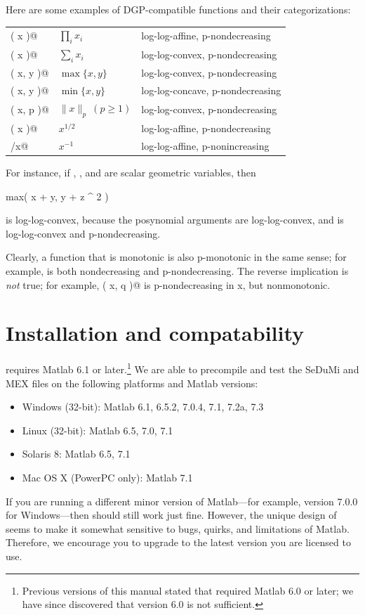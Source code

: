 \documentclass[12pt]{article}
\begin{document}
Here are some examples of DGP-compatible functions and their categorizations:
\begin{center}
\begin{tabular}{lll}
	\verb@prod( x )@    & $\prod_i x_i$& log-log-affine,  p-nondecreasing \\
	\verb@sum( x )@     & $\sum_i x_i$ & log-log-convex,  p-nondecreasing \\
	\verb@max( x, y )@  & $\max\{x,y\}$ & log-log-convex, p-nondecreasing \\
	\verb@min( x, y )@  & $\min\{x,y\}$ & log-log-concave, p-nondecreasing \\
	\verb@norm( x, p )@ & $\|x\|_p~(p\geq 1)$ & log-log-convex,  p-nondecreasing \\ 
	\verb@sqrt( x )@    & $x^{1/2}$    & log-log-affine, p-nondecreasing \\
	\verb@1/x@          & $x^{-1}$     & log-log-affine, p-nonincreasing
\end{tabular}
\end{center}
For instance, if \verb@x@, \verb@y@, and \verb@z@ are scalar geometric variables, then
\begin{code}
	max( x + y, y + z ^ 2 )
\end{code}
is log-log-convex, because the posynomial arguments are log-log-convex, and \verb@max@ is log-log-convex
and p-nondecreasing. 

Clearly, a function that is monotonic is also p-monotonic in the same sense;
for example, \verb@sum@ is both nondecreasing and p-nondecreasing. The
reverse implication is \emph{not} true; for example,
\verb@norm( x, q )@ is p-nondecreasing in x, but nonmonotonic.
\fi

\newpage
\appendix

\section{Installation and compatability}
\label{s-installing}

\cvx requires Matlab 6.1 or later.\footnote{Previous
versions of this manual stated that \cvx required Matlab
6.0 or later; we have since discovered that version 6.0
is not sufficient.}
We are able to precompile and test the SeDuMi
and \cvx MEX files on the following platforms and Matlab versions:
\begin{itemize}
\item Windows (32-bit): Matlab 6.1, 6.5.2, 7.0.4, 7.1, 7.2a, 7.3
\item Linux (32-bit): Matlab 6.5, 7.0, 7.1
\item Solaris 8: Matlab 6.5, 7.1
\item Mac OS X (PowerPC only): Matlab 7.1
\end{itemize}
If you are running a different minor version of Matlab---for example, version
7.0.0 for Windows---then \cvx should still work just fine. However, the unique
design of \cvx seems to make it somewhat sensitive to bugs, quirks, and 
limitations of Matlab. Therefore, we encourage you to upgrade to the latest
version you are licensed to use.
\end{document}
